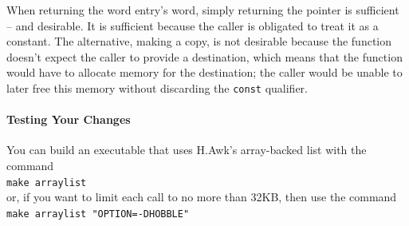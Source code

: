 \begin{description}
\end{description}

When returning the word entry's word, simply returning the pointer is sufficient -- and desirable.
It is sufficient because the caller is obligated to treat it as a constant.
The alternative, making a copy, is not desirable because the function doesn't expect the caller to provide a destination, which means that the function would have to allocate memory for the destination;
the caller would be unable to later free this memory without discarding the \lstinline{const} qualifier.

\paragraph{Testing Your Changes}

You can build an executable that uses H.Awk's array-backed list with the command \\
\verb+make arraylist+ \\
or, if you want to limit each  call to no more than 32KB, then use the command \\
\verb+make arraylist "OPTION=-DHOBBLE"+

